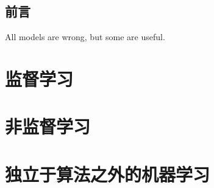 \documentclass[oneside,12pt]{ctexbook}
\begin{document}
\cleardoublepage
\maketitle
\tableofcontents

\chapter*{前言}
\begin{center}
All models are wrong, but some are useful.
\end{center}


\part{监督学习} %
\label{prt:监督学习_}
\clearpage








\part{非监督学习} %
\label{prt:非监督学习}





\part{独立于算法之外的机器学习} %
\label{prt:独立于算法之外的机器学习}





 
 
\end{document}
